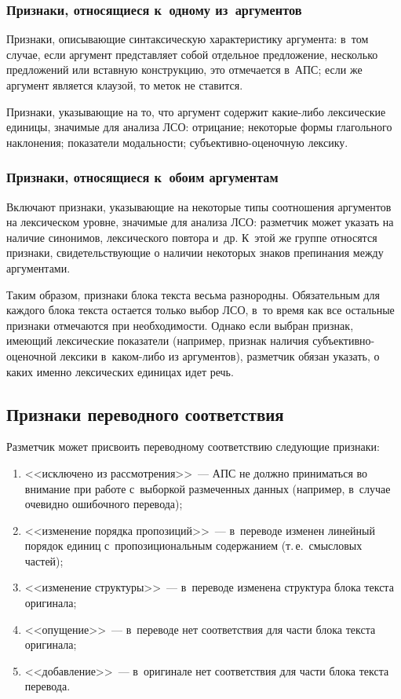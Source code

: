 \begin{multicols}{2}
\subsubsection{Признаки, относящиеся к~одному из~аргументов}

Признаки, описывающие синтаксическую характеристику аргумента: в~том 
случае, если аргумент представляет собой отдельное предложение, несколько 
предложений или вставную конструкцию, это отмечается в~АПС; если же 
аргумент является клаузой, то меток не ставится.

Признаки, указывающие на то, что аргумент содержит какие-либо 
лексические единицы, значимые для анализа ЛСО: отрицание; некоторые 
формы глагольного наклонения; показатели модальности; субъективно-оценочную лексику.

\subsubsection{Признаки, относящиеся к~обоим аргументам}

 Включают признаки, указывающие на некоторые типы соотношения 
аргументов на лексическом уровне, значимые для анализа ЛСО: разметчик 
может указать на наличие синонимов, лексического повтора и~др. К~этой же 
группе относятся признаки, свидетельствующие о наличии некоторых знаков 
препинания между аргументами.

Таким образом, признаки блока текста весьма разнородны. Обязательным 
для каждого блока текс\-та остается только выбор ЛСО, в~то время как все 
остальные признаки отмечаются при не\-об\-хо\-ди\-мости. Однако если выбран 
признак, имеющий лексические показатели (например, признак наличия  
субъ\-ек\-тив\-но-оце\-ноч\-ной лексики в~ка\-ком-ли\-бо из аргументов), 
разметчик обязан указать, о каких именно лексических единицах идет речь.

\subsection{Признаки переводного соответствия}

Разметчик может присвоить переводному соответствию следующие при\-знаки:
\begin{enumerate}[(1)]
\item <<исключено из рассмотрения>>~--- АПС не должно приниматься 
во внимание при работе с~выборкой размеченных данных (например, 
в~случае очевидно ошибочного перевода);
\item <<изменение порядка пропозиций>>~--- в~переводе изменен 
линейный порядок единиц с~пропозициональным содержанием (т.\,е.\ 
смыс\-ло\-вых частей);
\item <<изменение структуры>>~--- в~переводе изменена структура блока 
текста оригинала;
\item <<опущение>>~--- в~переводе нет соответствия для части блока 
текста оригинала;
\item <<добавление>>~--- в~оригинале нет соответствия для части блока 
текста перевода.
\end{enumerate}


\end{multicols}
